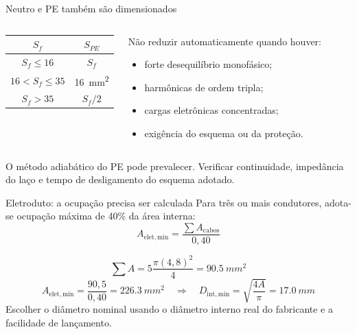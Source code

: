 \begin{frame}{Neutro e PE também são dimensionados}
\small
\begin{columns}[T,onlytextwidth]
\begin{caixaNorma}[title=Regra tabular usual do PE]
\begin{tabular}{cc}
\toprule
$S_f$ & $S_{PE}$ \\
\midrule
$S_f\leq16$ & $S_f$ \\
$16<S_f\leq35$ & \SI{16}{mm^2} \\
$S_f>35$ & $S_f/2$ \\
\bottomrule
\end{tabular}
\end{caixaNorma}
\begin{caixaAt}[title=Neutro]
Não reduzir automaticamente quando houver:
\begin{itemize}
\item forte desequilíbrio monofásico;
\item harmônicas de ordem tripla;
\item cargas eletrônicas concentradas;
\item exigência do esquema ou da proteção.
\end{itemize}
\end{caixaAt}
\end{columns}
\begin{caixaObs}
O método adiabático do PE pode prevalecer. Verificar continuidade, impedância do laço e tempo de desligamento do esquema adotado.
\end{caixaObs}
\end{frame}

\begin{frame}{Eletroduto: a ocupação precisa ser calculada}
\small
Para três ou mais condutores, adota-se ocupação máxima de 40\% da área interna:
\[
A_{\mathrm{elet,min}}=\frac{\sum A_{\mathrm{cabos}}}{0{,}40}
\]
\begin{caixaEx}[title=Cinco cabos com diâmetro externo de \SI{4.8}{mm}]
\[
\sum A=5\frac{\pi(4{,}8)^2}{4}=\SI{90.5}{mm^2}
\]
\[
A_{\mathrm{elet,min}}=\frac{90{,}5}{0{,}40}=\SI{226.3}{mm^2}
\quad\Rightarrow\quad
D_{\mathrm{int,min}}=\sqrt{\frac{4A}{\pi}}=\SI{17.0}{mm}
\]
Escolher o diâmetro nominal usando o diâmetro interno real do fabricante e a facilidade de lançamento.
\end{caixaEx}
\end{frame}

